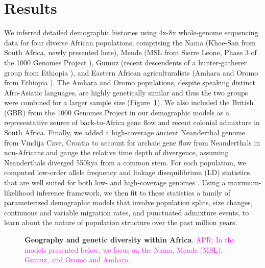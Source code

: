 \documentclass[]{article}
\newcommand{\aprcomment}[1]{{\textcolor{magenta}{APR: #1}}}
\begin{document}
\section*{Results}

We inferred detailed demographic histories using 4x-8x whole-genome sequencing
data for four diverse African populations, comprising the Nama (Khoe-San from
South Africa, newly presented here), Mende (MSL from Sierre Leone, Phase 3 of
the 1000 Genomes Project \citep{1000_Genomes_Project_Consortium2015-zq}), Gumuz
(recent descendents of a hunter-gatherer group from Ethiopia
\citep{Gurdasani2015-qy,Gopalan2019-wd}), and Eastern African agriculturalists
(Amhara and Oromo from Ethiopia \citep{Gurdasani2015-qy}). The Amhara and Oromo
populations, despite speaking distinct Afro-Asiatic languages, are highly
genetically similar \citep{Pagani2015-pz,Gopalan2019-wd} and thus the two
groups were combined for a larger sample size (Figure~\ref{fig:1}). We also
included the British (GBR) from the 1000 Genomes Project in our demographic
models as a representative source of back-to-Africa gene flow and recent
colonial admixture in South Africa. Finally, we added a high-coverage ancient
Neanderthal genome from Vindija Cave, Croatia \citep{Prufer2017-kk} to account
for archaic gene flow from Neanderthals in non-Africans and gauge the relative
time depth of divergence, assuming Neanderthals diverged 550kya from a common
stem. For each population, we computed low-order allele frequency and linkage
disequilibrium (LD) statistics that are well suited for both low- and
high-coverage genomes \citep{Ragsdale2019-nt,Ragsdale2020-nz}. Using a
maximum-likelihood inference framework, we then fit to these statistics a
family of parameterized demographic models that involve population splits, size
changes, continuous and variable migration rates, and punctuated admixture
events, to learn about the nature of population structure over the past million
years.

\begin{figure}[ht]
\begin{center}
\caption{\textbf{Geography and genetic diversity within Africa}.
    \aprcomment{In the models presented below, we focus on the Nama, 
    Mende (MSL), Gumuz, and Oromo and Amhara.}
}
\label{fig:1}
\end{center}
\end{figure}
\end{document}
